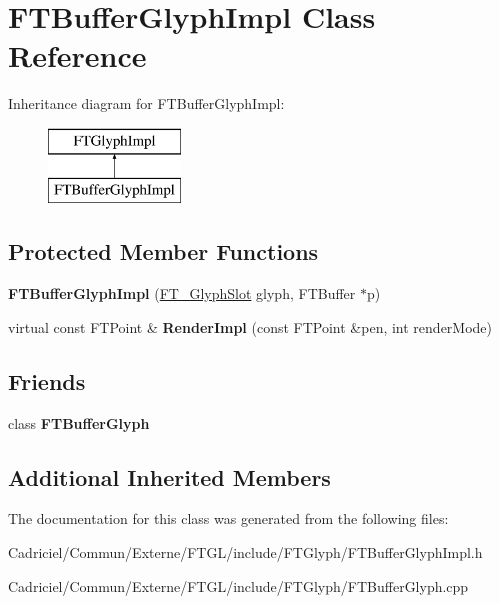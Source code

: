 \hypertarget{class_f_t_buffer_glyph_impl}{}\section{F\+T\+Buffer\+Glyph\+Impl Class Reference}
\label{class_f_t_buffer_glyph_impl}
Inheritance diagram for F\+T\+Buffer\+Glyph\+Impl\+:\begin{figure}[H]
\begin{center}
\leavevmode
\includegraphics[height=2.000000cm]{class_f_t_buffer_glyph_impl}
\end{center}
\end{figure}
\subsection*{Protected Member Functions}
\begin{DoxyCompactItemize}
\item 
{\bfseries F\+T\+Buffer\+Glyph\+Impl} (\hyperlink{struct_f_t___glyph_slot_rec__}{F\+T\+\_\+\+Glyph\+Slot} glyph, F\+T\+Buffer $\ast$p)\hypertarget{class_f_t_buffer_glyph_impl_a02a187494995d95792ef66767f04c56d}{}\label{class_f_t_buffer_glyph_impl_a02a187494995d95792ef66767f04c56d}

\item 
virtual const F\+T\+Point \& {\bfseries Render\+Impl} (const F\+T\+Point \&pen, int render\+Mode)\hypertarget{class_f_t_buffer_glyph_impl_a4f7f56caf34309cf7e1408a631b419de}{}\label{class_f_t_buffer_glyph_impl_a4f7f56caf34309cf7e1408a631b419de}

\end{DoxyCompactItemize}
\subsection*{Friends}
\begin{DoxyCompactItemize}
\item 
class {\bfseries F\+T\+Buffer\+Glyph}\hypertarget{class_f_t_buffer_glyph_impl_a385e2288042fd77f037a715e7801b451}{}\label{class_f_t_buffer_glyph_impl_a385e2288042fd77f037a715e7801b451}

\end{DoxyCompactItemize}
\subsection*{Additional Inherited Members}


The documentation for this class was generated from the following files\+:\begin{DoxyCompactItemize}
\item 
Cadriciel/\+Commun/\+Externe/\+F\+T\+G\+L/include/\+F\+T\+Glyph/F\+T\+Buffer\+Glyph\+Impl.\+h\item 
Cadriciel/\+Commun/\+Externe/\+F\+T\+G\+L/include/\+F\+T\+Glyph/F\+T\+Buffer\+Glyph.\+cpp\end{DoxyCompactItemize}
